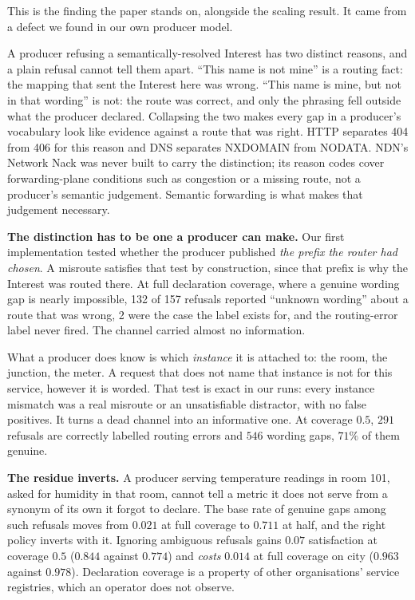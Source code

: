 \documentclass[conference,a4paper]{IEEEtran}
\begin{document}
This is the finding the paper stands on, alongside the scaling result. It
came from a defect we found in our own producer model.

A producer refusing a semantically-resolved Interest has two distinct
reasons, and a plain refusal cannot tell them apart. ``This name is not
mine'' is a routing fact: the mapping that sent the Interest here was
wrong. ``This name is mine, but not in that wording'' is not: the route was
correct, and only the phrasing fell outside what the producer declared.
Collapsing the two makes every gap in a producer's vocabulary look like
evidence against a route that was right. HTTP separates 404 from 406 for
this reason and DNS separates NXDOMAIN from NODATA. NDN's Network Nack was
never built to carry the distinction; its reason codes cover
forwarding-plane conditions such as congestion or a missing route, not a
producer's semantic judgement. Semantic forwarding is what makes that
judgement necessary.

\textbf{The distinction has to be one a producer can make.} Our first
implementation tested whether the producer published \emph{the prefix the
router had chosen}. A misroute satisfies that test by construction, since
that prefix is why the Interest was routed there. At full declaration
coverage, where a genuine wording gap is nearly impossible, 132 of 157
refusals reported ``unknown wording'' about a route that was wrong, 2 were
the case the label exists for, and the routing-error label never fired.
The channel carried almost no information.

What a producer does know is which \emph{instance} it is attached to: the
room, the junction, the meter. A request that does not name that instance
is not for this service, however it is worded. That test is exact in our
runs: every instance mismatch was a real misroute or an unsatisfiable
distractor, with no false positives. It turns a dead channel into an
informative one. At coverage $0.5$, $291$ refusals are correctly labelled
routing errors and $546$ wording gaps, $71\%$ of them genuine.

\textbf{The residue inverts.} A producer serving temperature readings in
room 101, asked for humidity in that room, cannot tell a metric it does not
serve from a synonym of its own it forgot to declare. The base rate of
genuine gaps among such refusals moves from $0.021$ at full coverage to
$0.711$ at half, and the right policy inverts with it. Ignoring ambiguous
refusals gains $0.07$ satisfaction at coverage $0.5$ ($0.844$ against
$0.774$) and \emph{costs} $0.014$ at full coverage on city ($0.963$ against
$0.978$). Declaration coverage is a property of other organisations'
service registries, which an operator does not observe.
\end{document}
